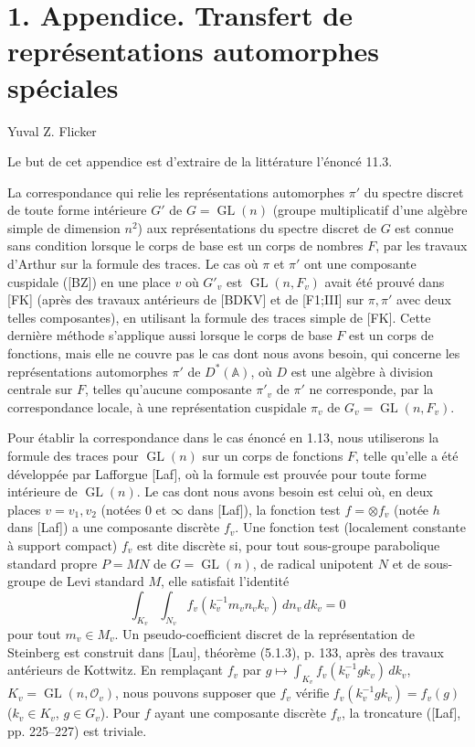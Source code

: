 \documentclass[10pt]{article}
\newcommand{\Adele}{\mathbb A}
\newcommand{\GL}{\operatorname{GL}}
\newcommand{\OO}{\mathcal O}
\theoremstyle{deligne}
\begin{document}
\section*{1. Appendice. Transfert de représentations automorphes spéciales}
\begin{center}Yuval Z. Flicker\end{center}

Le but de cet appendice est d'extraire de la littérature l'énoncé 11.3.

La correspondance qui relie les représentations automorphes $\pi'$ du spectre discret de toute forme intérieure $G'$ de $G=\GL(n)$ (groupe multiplicatif d'une algèbre simple de dimension $n^2$) aux représentations du spectre discret de $G$ est connue sans condition lorsque le corps de base est un corps de nombres $F$, par les travaux d'Arthur sur la formule des traces. Le cas où $\pi$ et $\pi'$ ont une composante cuspidale ([BZ]) en une place $v$ où $G'_v$ est $\GL(n,F_v)$ avait été prouvé dans [FK] (après des travaux antérieurs de [BDKV] et de [F1;III] sur $\pi,\pi'$ avec deux telles composantes), en utilisant la formule des traces simple de [FK]. Cette dernière méthode s'applique aussi lorsque le corps de base $F$ est un corps de fonctions, mais elle ne couvre pas le cas dont nous avons besoin, qui concerne les représentations automorphes $\pi'$ de $D^*(\Adele)$, où $D$ est une algèbre à division centrale sur $F$, telles qu'aucune composante $\pi'_v$ de $\pi'$ ne corresponde, par la correspondance locale, à une représentation cuspidale $\pi_v$ de $G_v=\GL(n,F_v)$.

Pour établir la correspondance dans le cas énoncé en 1.13, nous utiliserons la formule des traces pour $\GL(n)$ sur un corps de fonctions $F$, telle qu'elle a été développée par Lafforgue [Laf], où la formule est prouvée pour toute forme intérieure de $\GL(n)$. Le cas dont nous avons besoin est celui où, en deux places $v=v_1,v_2$ (notées $0$ et $\infty$ dans [Laf]), la fonction test $f=\otimes f_v$ (notée $h$ dans [Laf]) a une composante discrète $f_v$. Une fonction test (localement constante à support compact) $f_v$ est dite discrète si, pour tout sous-groupe parabolique standard propre $P=MN$ de $G=\GL(n)$, de radical unipotent $N$ et de sous-groupe de Levi standard $M$, elle satisfait l'identité
\[
\int_{K_v}\int_{N_v} f_v(k_v^{-1}m_vn_vk_v)\,dn_v\,dk_v=0
\]
pour tout $m_v\in M_v$. Un pseudo-coefficient discret de la représentation de Steinberg est construit dans [Lau], théorème (5.1.3), p. 133, après des travaux antérieurs de Kottwitz. En remplaçant $f_v$ par $g\mapsto\int_{K_v}f_v(k_v^{-1}gk_v)\,dk_v$, $K_v=\GL(n,\OO_v)$, nous pouvons supposer que $f_v$ vérifie $f_v(k_v^{-1}gk_v)=f_v(g)$ ($k_v\in K_v$, $g\in G_v$). Pour $f$ ayant une composante discrète $f_v$, la troncature ([Laf], pp. 225--227) est triviale.
\end{document}
